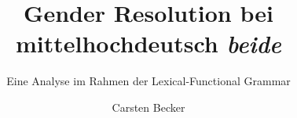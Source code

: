 \author{Carsten Becker}
\title{Gender Resolution bei mittelhochdeutsch \emph{beide}}
\subtitle{Eine Analyse im Rahmen der Lexical-Functional Grammar}
\renewcommand{\lsSeries}{ahl}
\renewcommand{\lsSeriesNumber}{}
